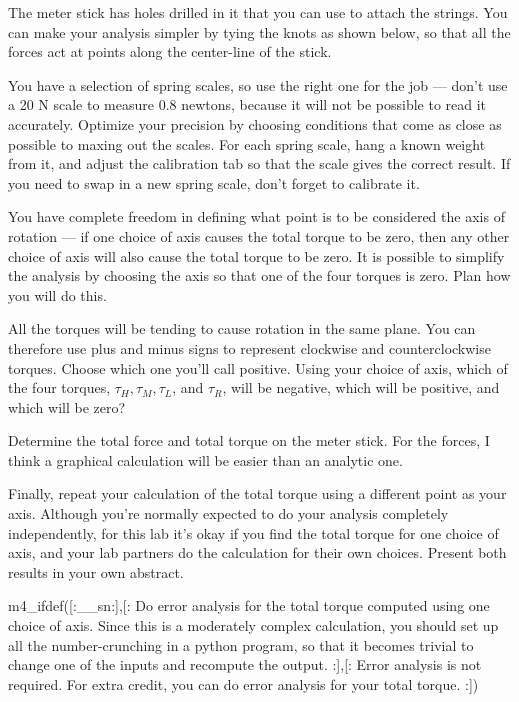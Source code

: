 The meter stick has holes drilled in it that you can use to
attach the strings. You can make your analysis simpler by
tying the knots as shown below, so that all the forces act
at points along the center-line of the stick.


You have a selection of spring scales, so use the
right one for the job --- don't use a 20 N scale to
measure 0.8 newtons, because it will not be possible to read it accurately.
Optimize your precision by choosing conditions that come as close as possible
to maxing out the scales.
For each spring scale, hang a known weight from it, and adjust the
calibration tab so that the scale gives the correct result.
If you need to swap in a new spring scale, don't forget to calibrate it.

\prelab

\prelabquestion  You have complete freedom in defining what point is to be considered the axis of
rotation ---  if one choice of axis causes the total torque
to be zero, then any other choice of axis will also cause
the total torque to be zero.  It is possible to simplify the
analysis by choosing the axis so that one of the four
torques is zero.  Plan how you will do this.

\prelabquestion  All the torques will be tending to cause rotation in the
same plane.  You can therefore use plus and minus signs to
represent clockwise and counterclockwise torques.  Choose
which one you'll call positive.  Using your choice of axis,
which of the four torques, $\tau_H,\tau_M,\tau_L$, and
$\tau_R$, will be negative, which will be positive,
and which will be zero?

\analysis

Determine the total force and total torque on the meter
stick.  For the forces, I think a graphical calculation will
be easier than an analytic one.

Finally, repeat your calculation of the total torque using a
different point as your axis. Although you're normally expected to
do your analysis completely independently, for this lab it's okay
if you find the total torque for one choice of axis, and your lab
partners do the calculation for their own choices. Present both
results in your own abstract.

m4_ifdef([:__sn:],[:%
Do error analysis for the total torque computed using one choice of axis.
Since this is a moderately complex calculation, you should set up all the number-crunching in
a python program, so that it becomes trivial to change
one of the inputs and recompute the output.
:],[:%
Error analysis is not required. For extra credit, you can do
error analysis for your total torque.
:])
